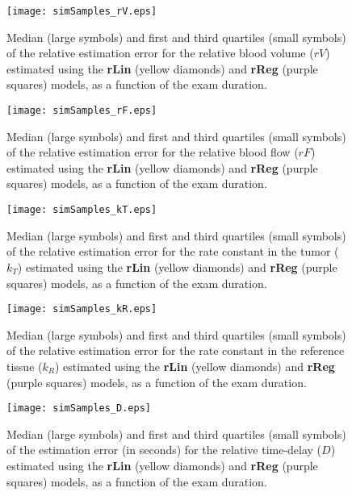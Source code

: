 \begin{subfigures}
    \begin{figure}\centering
        \texttt{[image: simSamples\_rV.eps]}
        \caption{Median (large symbols) and first and third quartiles (small symbols) of the relative estimation error for the relative blood volume ($rV$) estimated using the \textbf{rLin} (yellow diamonds) and \textbf{rReg} (purple squares) models, as a function of the exam duration.}
        \label{fig:examDuration_rV}
    \end{figure}
    \begin{figure}\centering
        \texttt{[image: simSamples\_rF.eps]}
        \caption{Median (large symbols) and first and third quartiles (small symbols) of the relative estimation error for the relative blood flow ($rF$) estimated using the \textbf{rLin} (yellow diamonds) and \textbf{rReg} (purple squares) models, as a function of the exam duration.}
        \label{fig:examDuration_rF}
    \end{figure}
    \begin{figure}\centering
        \texttt{[image: simSamples\_kT.eps]}
        \caption{Median (large symbols) and first and third quartiles (small symbols) of the relative estimation error for the rate constant in the tumor ($k_T$) estimated using the \textbf{rLin} (yellow diamonds) and \textbf{rReg} (purple squares) models, as a function of the exam duration.}
        \label{fig:examDuration_kT}
    \end{figure}
    \begin{figure}\centering
        \texttt{[image: simSamples\_kR.eps]}
        \caption{Median (large symbols) and first and third quartiles (small symbols) of the relative estimation error for the rate constant in the reference tissue ($k_R$) estimated using the \textbf{rLin} (yellow diamonds) and \textbf{rReg} (purple squares) models, as a function of the exam duration.}
        \label{fig:examDuration_kR}
    \end{figure}
    \begin{figure}\centering
        \texttt{[image: simSamples\_D.eps]}
        \caption{Median (large symbols) and first and third quartiles (small symbols) of the estimation error (in seconds) for the relative time-delay ($D$) estimated using the \textbf{rLin} (yellow diamonds) and \textbf{rReg} (purple squares) models, as a function of the exam duration.}
        \label{fig:examDuration_D}
    \end{figure}
\end{subfigures}
\FloatBarrier

